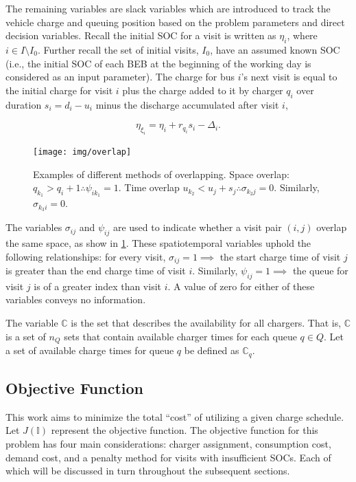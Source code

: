 \documentclass[energies,article,submit,moreauthors]{Definitions/mdpi}
\newcommand{\I}{\mathbb{I}}                 %
\newcommand{\C}{\mathbb{C}}                 %
\newcommand{\Iset}{I}                       %
\begin{document}
The remaining variables are slack variables which are introduced to track the vehicle charge and queuing position based
on the problem parameters and direct decision variables. Recall the initial SOC for a visit is written as \(\eta_i\), where
\(i \in \Iset \setminus \Iset_0\). Further recall the set of initial visits, \(\Iset_0\), have an assumed known SOC (i.e., the initial
SOC of each BEB at the beginning of the working day is considered as an input parameter). The charge for bus \(i\)'s next
visit is equal to the initial charge for visit \(i\) plus the charge added to it by charger \(q_i\) over duration \(s_i =
d_i - u_i\) minus the discharge accumulated after visit \(i\),

\begin{equation}
\label{eq:bat-chain}
  \eta_{\xi_i} = \eta_i + r_{q_i}s_i - \Delta_i\text{.}
\end{equation}

\begin{figure}
    \centering
    \texttt{[image: img/overlap]}
    \caption{Examples of different methods of overlapping. Space overlap: $q_{k_1} > q_{i} + 1 \therefore \psi_{ik_{1}} = 1$.
      Time overlap $u_{k_2} < u_{j} + s_j \therefore \sigma_{k_{2}j} = 0$. Similarly, $\sigma_{k_3 i} = 0$.}
    \label{fig:overlap}
  \end{figure}

The variables \(\sigma_{ij}\) and \(\psi_{ij}\) are used to indicate whether a visit pair \((i, j)\) overlap the same space, as show
in \ref{fig:overlap}. These spatiotemporal variables uphold the following relationships: for every
visit, \(\sigma_{ij} = 1 \implies\) the start charge time of visit \(j\) is greater than the end charge time of visit \(i\).
Similarly, \(\psi_{ij} = 1 \implies\) the queue for visit \(j\) is of a greater index than visit \(i\). A value of zero for
either of these variables conveys no information.

The variable \(\C\) is the set that describes the availability for all chargers. That is, \(\C\) is a set of \(n_Q\) sets that
contain available charger times for each queue \(q \in Q\). Let a set of available charge times for queue \(q\) be defined as
\(\C_q\).

\subsection{Objective Function}
\label{sec:sa-objective-function}
This work aims to minimize the total ``cost'' of utilizing a given charge schedule. Let \(J(\I)\) represent the objective
function. The objective function for this problem has four main considerations: charger assignment, consumption cost,
demand cost, and a penalty method for visits with insufficient SOCs. Each of which will be discussed in turn throughout
the subsequent sections.
\end{document}
